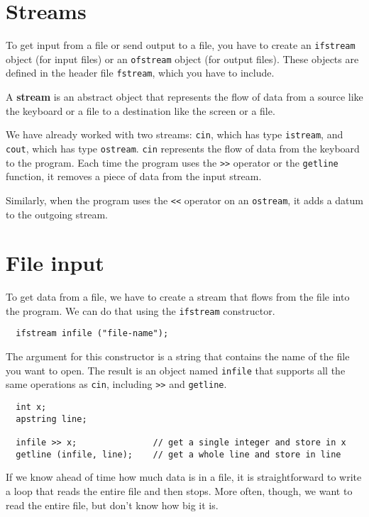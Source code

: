 \section {Streams}

To get input from a file or send output to a file, you have to
create an {\tt ifstream} object (for input files) or an
{\tt ofstream} object (for output files).  These objects
are defined in the header file {\tt fstream}, which you
have to include.


A {\bf stream} is an abstract object that represents the flow
of data from a source like the keyboard or a file to a destination
like the screen or a file.

We have already worked with two streams: {\tt cin}, which has type
{\tt istream}, and {\tt cout}, which has type {\tt ostream}.
{\tt cin} represents the flow of data from the keyboard to
the program.  Each time the program uses the {\tt >>} operator
or the {\tt getline} function, it removes a piece of data
from the input stream.


Similarly, when the program uses the {\tt <<} operator on
an {\tt ostream}, it adds a datum to the outgoing stream.

\section {File input}
\label{finput}

To get data from a file, we have to create a stream that flows
from the file into the program.  
We can do that using the {\tt ifstream} constructor.

\begin{verbatim}
  ifstream infile ("file-name");
\end{verbatim}
%
The argument for this constructor is a string that
contains the name of the file you want to open.  The result
is an object named {\tt infile} that supports all the same
operations as {\tt cin}, including {\tt >>} and {\tt getline}.

\begin{verbatim}
  int x;
  apstring line;
    
  infile >> x;               // get a single integer and store in x
  getline (infile, line);    // get a whole line and store in line
\end{verbatim}
%
If we know ahead of time how much data is in a file, it is 
straightforward to write a loop that reads the entire file and
then stops.  More often, though, we want to read the entire
file, but don't know how big it is.

